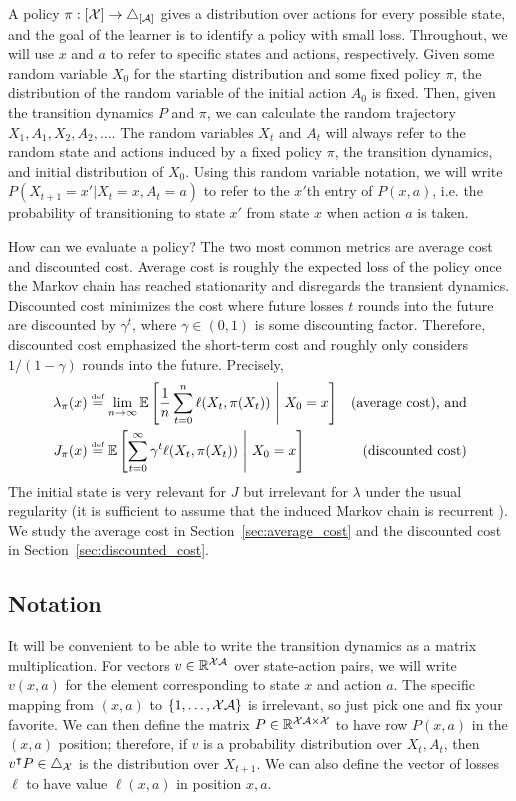 \documentclass[11pt]{article}
\newcommand{\df}{\stackrel{\mbox{\rm\tiny def}}{=}}
\begin{document}
A policy $\pi:[{\cal X}]\rightarrow \triangle_{[{\cal A}]}$ gives a distribution over actions for every possible state, and the goal of the learner is to identify a policy with small loss. Throughout, we will use $x$ and $a$ to refer to specific states and actions, respectively. Given some random variable $X_0$ for the starting distribution and some fixed policy $\pi$, the distribution of the random variable of the initial action $A_0$ is fixed. Then, given the transition dynamics $P$ and $\pi$, we can calculate the random trajectory $X_1, A_1, X_2, A_2,\ldots$. The random variables $X_t$ and $A_t$ will always refer to the random state and actions induced by a fixed policy $\pi$, the transition dynamics, and initial distribution of $X_0$. Using this random variable notation, we will write $P(X_{t+1} = x' | X_t = x, A_t = a)$ to refer to the $x'$th entry of $P(x,a)$, i.e. the probability of transitioning to state $x'$ from state $x$ when action $a$ is taken.

How can we evaluate a policy? The two most common metrics are average cost and discounted cost. Average cost is roughly the expected loss of the policy once the Markov chain has reached stationarity and disregards the transient dynamics. Discounted cost minimizes the cost where future losses $t$ rounds into the future are discounted by $\gamma^t$, where $\gamma\in(0,1)$ is some discounting factor. Therefore, discounted cost emphasized the short-term cost and roughly only considers $1/(1-\gamma)$ rounds into the future. Precisely,
\begin{align}
\lambda_\pi(x) &\df \lim_{n\rightarrow\infty}\ex\left[\frac{1}{n}\sum_{t=0}^n \ell(X_t,\pi(X_t)) \ \middle| \ X_0 = x\right] &\text{(average cost), and}\\
J_\pi(x) &\df \ex\left[\sum_{t=0}^\infty \gamma^t \ell(X_t,\pi(X_t)) \ \middle| \ X_0 = x\right] &\text{(discounted cost)}
\end{align}
The initial state is very relevant for $J$ but irrelevant for $\lambda$ under the usual regularity (it is sufficient to assume that the induced Markov chain is recurrent \citep{Puterman:MDP}). We study the average cost in Section~\ref{sec:average_cost} and the discounted cost in Section~\ref{sec:discounted_cost}.

\subsection{Notation}
It will be convenient to be able to write the transition dynamics as a matrix multiplication. For vectors $v\in\mathbb R^{{\cal X} {\cal A}}$ over state-action pairs, we will write $v(x,a)$ for the element corresponding to state $x$ and action $a$. The specific mapping from $(x,a)$ to $\{1,\ldots, {\cal X}{\cal A}\}$ is irrelevant, so just pick one and fix your favorite. We can then define the matrix $P \in \mathbb R^{{\cal X}{\cal A}\times {\cal X}}$ to have row $P(x,a)$ in the $(x,a)$ position; therefore, if $v$ is a probability distribution over $X_t, A_t$, then $v^\intercal P \in \triangle_{{\cal X}}$ is the distribution over $X_{t+1}$. We can also define the vector of losses $\ell$ to have value $\ell(x,a)$ in position $x,a$.
\end{document}
